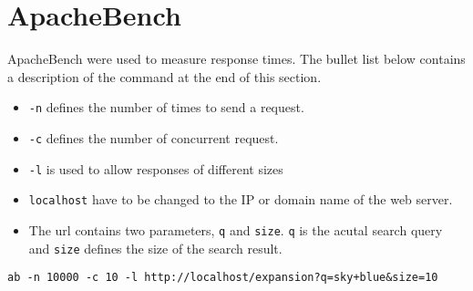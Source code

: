 \section{ApacheBench}
\label{ap:apache-benchmark}

ApacheBench \cite{apache-benchmark} were used to measure response times.
The bullet list below contains a description of the command at the end of this section.

\begin{itemize}
  \item \texttt{-n} defines the number of times to send a request.
  \item \texttt{-c} defines the number of concurrent request.
  \item \texttt{-l} is used to allow responses of different sizes
  \item \texttt{localhost} have to be changed to the IP or domain name of the web server.
  \item The url contains two parameters, \texttt{q} and \texttt{size}.
  \texttt{q} is the acutal search query and \texttt{size} defines the size of the search result.
\end{itemize}

\texttt{ab -n 10000 -c 10 -l http://localhost/expansion?q=sky+blue\&size=10}

